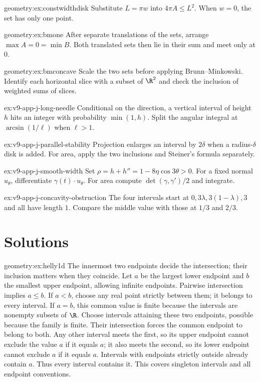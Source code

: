 \begin{hint}{geometry:ex:constwidthdisk}
Substitute $L=\pi w$ into $4\pi A\le L^2$. When $w=0$, the set has only one point.
\end{hint}
\begin{hint}{geometry:ex:bmone}
After separate translations of the sets, arrange $\max A=0=\min B$. Both translated sets then lie in their sum and meet only at $0$.
\end{hint}
\begin{hint}{geometry:ex:bmconcave}
Scale the two sets before applying Brunn--Minkowski. Identify each horizontal slice with a subset of $\R^2$ and check the inclusion of weighted sums of slices.
\end{hint}
\begin{hint}{ex:v9-app-j-long-needle}
Conditional on the direction, a vertical interval of height $h$ hits an integer with probability $\min(1,h)$. Split the angular integral at $\arcsin(1/\ell)$ when $\ell>1$.
\end{hint}
\begin{hint}{ex:v9-app-j-parallel-stability}
Projection enlarges an interval by $2\delta$ when a radius-$\delta$ disk is added. For area, apply the two inclusions and Steiner's formula separately.
\end{hint}
\begin{hint}{ex:v9-app-j-smooth-width}
Set $\rho=h+h''=1-8\eta\cos3\theta>0$. For a fixed normal $u_\theta$, differentiate $\gamma(t)\cdot u_\theta$. For area compute $\det(\gamma,\gamma')/2$ and integrate.
\end{hint}
\begin{hint}{ex:v9-app-j-concavity-obstruction}
The four intervals start at $0,3\lambda,3(1-\lambda),3$ and all have length $1$. Compare the middle value with those at $1/3$ and $2/3$.
\end{hint}

\section{Solutions}

\begin{solution}{geometry:ex:helly1d}
\idea The innermost two endpoints decide the intersection; their inclusion matters when they coincide.
\writeup Let $a$ be the largest lower endpoint and $b$ the smallest upper endpoint, allowing infinite endpoints. Pairwise intersection implies $a\le b$. If $a<b$, choose any real point strictly between them; it belongs to every interval. If $a=b$, this common value is finite because the intervals are nonempty subsets of $\R$. Choose intervals attaining these two endpoints, possible because the family is finite. Their intersection forces the common endpoint to belong to both. Any other interval meets the first, so its upper endpoint cannot exclude the value $a$ if it equals $a$; it also meets the second, so its lower endpoint cannot exclude $a$ if it equals $a$. Intervals with endpoints strictly outside already contain $a$. Thus every interval contains it. This covers singleton intervals and all endpoint conventions.
\end{solution}

